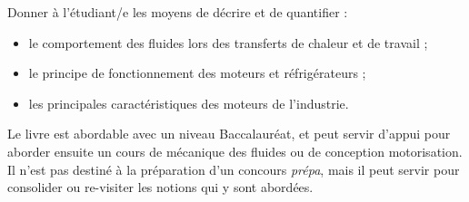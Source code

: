 Donner à l’étudiant/e les moyens de décrire et de quantifier :
	\begin{itemize}
		\item le comportement des fluides lors des transferts de chaleur et de travail ;
		\item le principe de fonctionnement des moteurs et réfrigérateurs ;
		\item les principales caractéristiques des moteurs de l’industrie.
	\end{itemize}

Le livre est abordable avec un niveau Baccalauréat, et peut servir d’appui pour aborder ensuite un cours de mécanique des fluides ou de conception motorisation. Il n’est pas destiné à la préparation d’un concours \textit{prépa}, mais il peut servir pour consolider ou re-visiter les notions qui y sont abordées.
